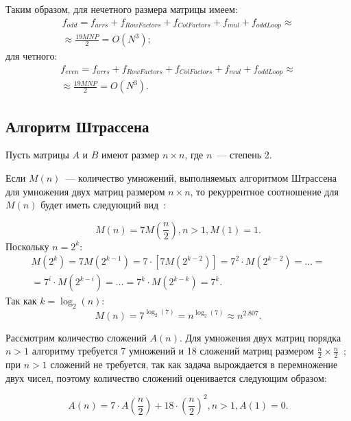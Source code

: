 Таким образом, для нечетного размера матрицы имеем:
\begin{multline}
    f_{odd} = f_{arrs} + f_{RowFactors} + f_{ColFactors} + f_{mul} + f_{oddLoop} \approx \\ \approx \frac{19MNP}{2} = O(N^3);
\end{multline}
для четного:
\begin{multline}
    f_{even} = f_{arrs} + f_{RowFactors} + f_{ColFactors} + f_{mul} + f_{oddLoop} \approx \\ \approx \frac{19MNP}{2} = O(N^3).
\end{multline}

\subsection{Алгоритм Штрассена}

Пусть матрицы $A$ и $B$ имеют размер $n \times n$, где $n$~--- степень 2.

Если $M(n)$~---  количество умножений, выполняемых алгоритмом Штрассена для умножения двух матриц размером $n \times n$, то рекуррентное соотношение для $M(n)$ будет иметь следующий вид~\cite{strassen-elib}:

\begin{equation}
    M(n) = 7M \left (\frac{n}{2} \right ), n > 1, M(1) = 1.
\end{equation}
Поскольку $n = 2^k$:
\begin{equation}
    \begin{gathered}
        M(2^k) = 7M(2^{k - 1}) = 7 \cdot [7M(2^{k - 2})] = 7^2 \cdot M(2^{k-2}) = \ldots = \\
        = 7^i \cdot M(2^{k-i}) = \ldots = 7^k \cdot M(2^{k-k}) = 7^k.
    \end{gathered}
\end{equation}
Так как $k = \log_2{(n)}$:
\begin{equation}
    M(n) = 7^{\log_2{(7)}} = n^{\log_2{(7)}} \approx n^{2.807}.
\end{equation}

Рассмотрим количество сложений $A(n)$.
Для умножения двух матриц порядка $n > 1$ алгоритму требуется 7 умножений и 18 сложений матриц размером $\frac{n}{2} \times \frac{n}{2}$~\cite{strassen-elib}; при $n > 1$ сложений не требуется, так как задача вырождается в перемножение двух чисел, поэтому количество сложений оценивается следующим образом:

\begin{equation}
    A(n) = 7 \cdot A \left ( \frac{n}{2} \right ) + 18 \cdot \left ( \frac{n}{2} \right )^2, n > 1, A(1) = 0.
\end{equation}

